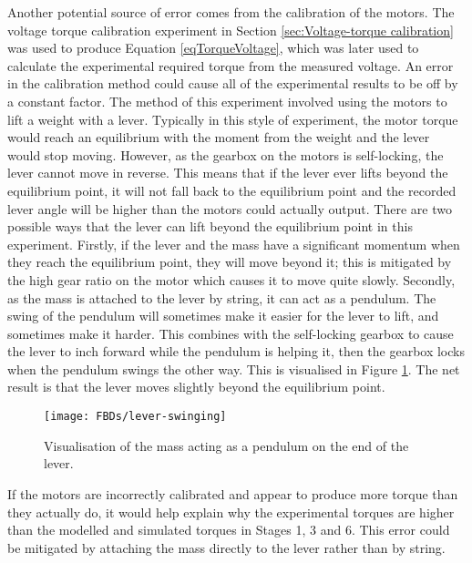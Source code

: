 Another potential source of error comes from the calibration of the motors. The voltage torque calibration experiment in Section \ref{sec:Voltage-torque calibration} was used to produce Equation \ref{eqTorqueVoltage}, which was later used to calculate the experimental required torque from the measured voltage. An error in the calibration method could cause all of the experimental results to be off by a constant factor. The method of this experiment involved using the motors to lift a weight with a lever. Typically in this style of experiment, the motor torque would reach an equilibrium with the moment from the weight and the lever would stop moving. However, as the gearbox on the motors is self-locking, the lever cannot move in reverse. This means that if the lever ever lifts beyond the equilibrium point, it will not fall back to the equilibrium point and the recorded lever angle will be higher than the motors could actually output. There are two possible ways that the lever can lift beyond the equilibrium point in this experiment. Firstly, if the lever and the mass have a significant momentum when they reach the equilibrium point, they will move beyond it; this is mitigated by the high gear ratio on the motor which causes it to move quite slowly. Secondly, as the mass is attached to the lever by string, it can act as a pendulum. The swing of the pendulum will sometimes make it easier for the lever to lift, and sometimes make it harder. This combines with the self-locking gearbox to cause the lever to inch forward while the pendulum is helping it, then the gearbox locks when the pendulum swings the other way. This is visualised in Figure \ref{fig:lever-swinging}. The net result is that the lever moves slightly beyond the equilibrium point. \\

\begin{figure}[!h]
	\centering
	\texttt{[image: FBDs/lever-swinging]}
	\caption{Visualisation of the mass acting as a pendulum on the end of the lever.}
	\label{fig:lever-swinging}
\end{figure}

If the motors are incorrectly calibrated and appear to produce more torque than they actually do, it would help explain why the experimental torques are higher than the modelled and simulated torques in Stages 1, 3 and 6. This error could be mitigated by attaching the mass directly to the lever rather than by string.


